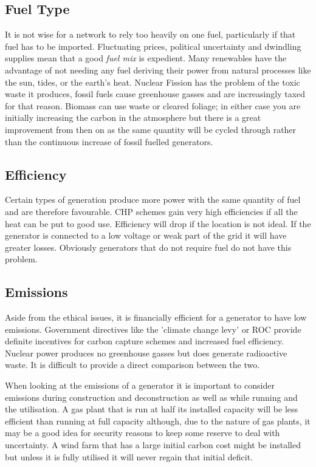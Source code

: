 \documentclass[a4paper,oneside,12pt]{report}
\begin{document}
\subsection{Fuel Type}

It is not wise for a network to rely too heavily on one fuel, particularly if that fuel has to be imported. Fluctuating prices, political uncertainty and dwindling supplies mean that a good \emph{fuel mix} is expedient. Many renewables have the advantage of not needing any fuel deriving their power from natural processes like the sun, tides, or the earth's heat. Nuclear Fission has the problem of the toxic waste it produces, fossil fuels cause greenhouse gasses and are increasingly taxed for that reason. Biomass can use waste or cleared foliage; in either case you are initially increasing the carbon in the atmosphere but there is a great improvement from then on as the same quantity will be cycled through rather than the continuous increase of fossil fuelled generators.

\subsection{Efficiency}

Certain types of generation produce more power with the same quantity of fuel and are therefore favourable. CHP schemes gain very high efficiencies if all the heat can be put to good use. Efficiency will drop if the location is not ideal. If the generator is connected to a low voltage or weak part of the grid it will have greater losses. Obviously generators that do not require fuel do not have this problem.

\subsection{Emissions}

Aside from the ethical issues, it is financially efficient for a generator to have low emissions. Government directives like the 'climate change levy' or ROC \cite{DTI2007a} provide definite incentives for carbon capture schemes and increased fuel efficiency. Nuclear power produces no greenhouse gasses but does generate radioactive waste. It is difficult to provide a direct comparison between the two.

When looking at the emissions of a generator it is important to consider emissions during construction and deconstruction as well as while running and the utilisation. A gas plant that is run at half its installed capacity will be less efficient than running at full capacity although, due to the nature of gas plants, it may be a good idea for security reasons to keep some reserve to deal with uncertainty. A wind farm that has a large initial carbon cost might be installed but unless it is fully utilised it will never regain that initial deficit.
\end{document}
